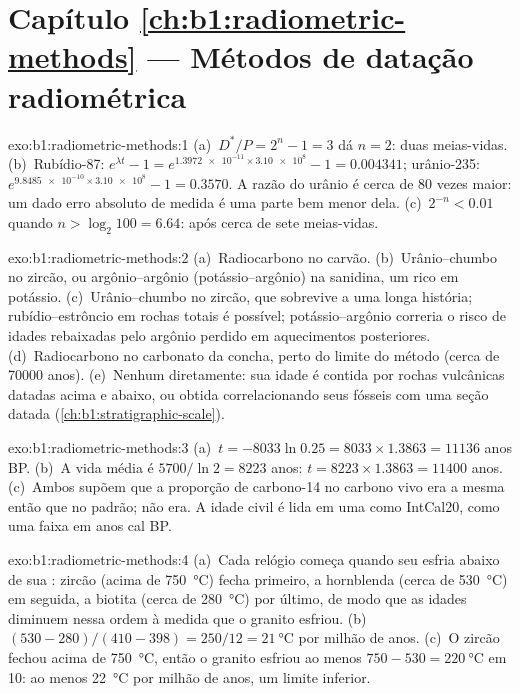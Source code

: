 \section*{Capítulo \ref{ch:b1:radiometric-methods} --- Métodos de datação radiométrica}

\begin{solution}{exo:b1:radiometric-methods:1}
(a)~$D^*/P = 2^n - 1 = 3$ dá $n = 2$: duas meias-vidas. (b)~Rubídio-87:
$e^{\lambda t} - 1 = e^{\num{1.3972e-11} \times \num{3.10e8}} - 1 = 0.004341$;
urânio-235: $e^{\num{9.8485e-10} \times \num{3.10e8}} - 1 = 0.3570$. A razão do urânio é
cerca de 80 vezes maior: um dado erro absoluto de medida é uma parte bem menor dela.
(c)~$2^{-n} < 0.01$ quando $n > \log_2 100 = 6.64$: após cerca de sete meias-vidas.
\end{solution}

\begin{solution}{exo:b1:radiometric-methods:2}
(a)~Radiocarbono no carvão. (b)~Urânio--chumbo no zircão, ou argônio--argônio
(potássio--argônio) na sanidina, um  rico em potássio. (c)~Urânio--chumbo no zircão,
que sobrevive a uma longa história; rubídio--estrôncio em rochas totais é possível;
potássio--argônio correria o risco de idades rebaixadas pelo argônio perdido em aquecimentos
posteriores. (d)~Radiocarbono no carbonato da concha, perto do limite do método (cerca de
\num{70000} anos). (e)~Nenhum diretamente: sua idade é contida por rochas vulcânicas datadas
acima e abaixo, ou obtida correlacionando seus fósseis com uma seção datada
(\cref{ch:b1:stratigraphic-scale}).
\end{solution}

\begin{solution}{exo:b1:radiometric-methods:3}
(a)~$t = -8033 \ln 0.25 = 8033 \times 1.3863 = \num{11136}$ anos BP.
(b)~A vida média é $5700/\ln 2 = \num{8223}$ anos: $t = 8223 \times 1.3863 =
\num{11400}$ anos. (c)~Ambos supõem que a proporção de carbono-14 no carbono vivo era a mesma
então que no padrão; não era. A idade civil é lida em uma  como IntCal20,
como uma faixa em anos cal BP.
\end{solution}

\begin{solution}{exo:b1:radiometric-methods:4}
(a)~Cada relógio começa quando seu  esfria abaixo de sua :
zircão (acima de \qty{750}{\celsius}) fecha primeiro, a hornblenda (cerca de
\qty{530}{\celsius}) em seguida, a biotita (cerca de \qty{280}{\celsius}) por último, de modo
que as idades diminuem nessa ordem à medida que o granito esfriou. (b)~$(530 - 280)/(410 - 398) =
250/12 = \qty{21}{\celsius}$ por milhão de anos. (c)~O zircão fechou acima de
\qty{750}{\celsius}, então o granito esfriou ao menos $750 - 530 =
\qty{220}{\celsius}$ em \qty{10}{\Myr}: ao menos \qty{22}{\celsius} por milhão de anos, um
limite inferior.
\end{solution}

